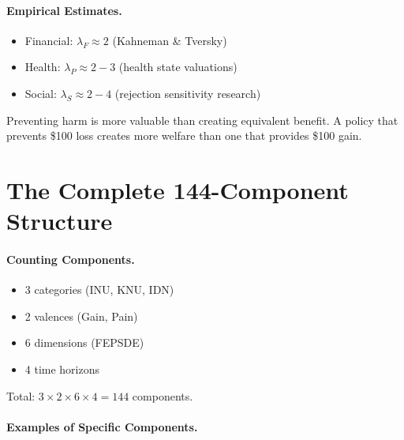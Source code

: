 \paragraph{Empirical Estimates.}
\begin{itemize}[nosep]
  \item Financial: $\lambda_F \approx 2$ (Kahneman \& Tversky)
  \item Health: $\lambda_P \approx 2-3$ (health state valuations)
  \item Social: $\lambda_S \approx 2-4$ (rejection sensitivity research)
\end{itemize}

\begin{intuition}
Preventing harm is more valuable than creating equivalent benefit.
A policy that prevents \$100 loss creates more welfare than one that provides \$100 gain.
\end{intuition}



\section{The Complete 144-Component Structure}
\label{sec:fepsde-complete}


\paragraph{Counting Components.}
\begin{itemize}[nosep]
  \item 3 categories (INU, KNU, IDN)
  \item 2 valences (Gain, Pain)
  \item 6 dimensions (FEPSDE)
  \item 4 time horizons
\end{itemize}

Total: $3 \times 2 \times 6 \times 4 = 144$ components.

\paragraph{Examples of Specific Components.}

